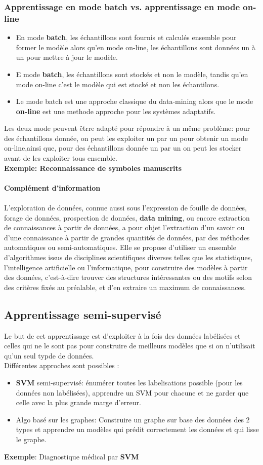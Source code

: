 \subsubsection{Apprentissage en mode batch vs. apprentissage en mode on-line}
\begin{itemize}
    \item En mode \textbf{batch}, les échantillons sont fournis et calculés ensemble pour former le modèle alors qu'en mode on-line, les échantillons sont données un à un pour mettre à jour le modèle.
    \item E mode \textbf{batch}, les échantillons sont stockés et non le modèle, tandis qu'en mode on-line c'est le modèle qui est stocké et non les échantilons. 
    \item Le mode batch est une approche classique du data-mining alors que le mode \textbf{on-line} est une methode approche pour les systèmes adaptatifs.
\end{itemize}
Les deux mode peuvent êtrre adapté pour répondre à un même problème: pour des échantillons donnée, on peut les exploiter un par un pour obtenir un mode on-line,ainsi que, pour des échantillons donnée un par un on peut les stocker avant de les exploiter tous ensemble.\\
\textbf{Exemple: Reconnaissance de symboles manuscrits}
\\\\
\textbf{Complément d'information}\\\\
L’exploration de données, connue aussi sous l'expression de fouille de données, forage de données, prospection de données, \textbf{data mining}, ou encore extraction de connaissances à partir de données, a pour objet l’extraction d'un savoir ou d'une connaissance à partir de grandes quantités de données, par des méthodes automatiques ou semi-automatiques.
Elle se propose d'utiliser un ensemble d'algorithmes issus de disciplines scientifiques diverses telles que les statistiques, l'intelligence artificielle ou l'informatique, pour construire des modèles à partir des données, c'est-à-dire trouver des structures intéressantes ou des motifs selon des critères fixés au préalable, et d'en extraire un maximum de connaissances.
\subsection{Apprentissage semi-supervisé}
Le but de cet apprentissage est d'exploiter à la fois des données labélisées et celles qui ne le sont pas pour construire de meilleurs modèles que si on n'utilisait qu'un seul typde de données.\\
Différentes approches sont possibles : 
\begin{itemize}
    \item \textbf{SVM} semi-supervisé: énumérer toutes les labelisations possible (pour les données non labélisées), apprendre un SVM pour chacune et ne garder que celle avec la plus grande marge d'erreur. 
    \item Algo basé sur les graphes: Construire un graphe sur base des données des 2 types et apprendre un modèles qui prédit correctement les données et qui lisse le graphe.
\end{itemize}
\textbf{Exemple}: Diagnostique médical par \textbf{SVM}
